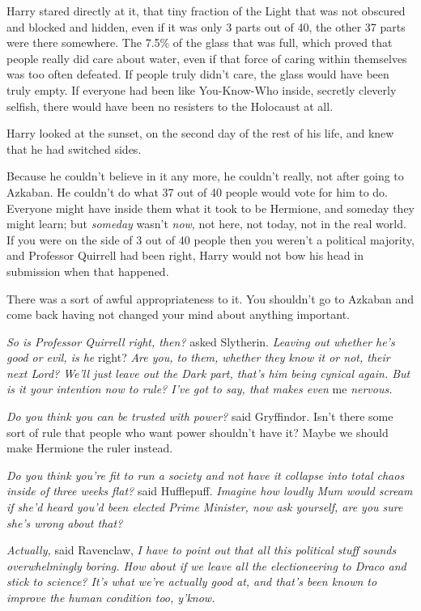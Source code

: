 Harry stared directly at it, that tiny fraction of the Light that was not obscured and blocked and hidden, even if it was only 3 parts out of 40, the other 37 parts were there somewhere. The 7.5\% of the glass that was full, which proved that people really did care about water, even if that force of caring within themselves was too often defeated. If people truly didn't care, the glass would have been truly empty. If everyone had been like You-Know-Who inside, secretly cleverly selfish, there would have been no resisters to the Holocaust at all.

Harry looked at the sunset, on the second day of the rest of his life, and knew that he had switched sides.

Because he couldn't believe in it any more, he couldn't really, not after going to Azkaban. He couldn't do what 37 out of 40 people would vote for him to do. Everyone might have inside them what it took to be Hermione, and someday they might learn; but \emph{someday} wasn't \emph{now}, not here, not today, not in the real world. If you were on the side of 3 out of 40 people then you weren't a political majority, and Professor Quirrell had been right, Harry would not bow his head in submission when that happened.

There was a sort of awful appropriateness to it. You shouldn't go to Azkaban and come back having not changed your mind about anything important.

\emph{So is Professor Quirrell right, then?} asked Slytherin. \emph{Leaving out whether he's good or evil, is he} right? \emph{Are you, to them, whether they know it or not, their next Lord? We'll just leave out the Dark part, that's him being cynical again. But is it your intention now to rule? I've got to say, that makes even} me \emph{nervous.}

\emph{Do you think you can be trusted with power?} said Gryffindor. Isn't there some sort of rule that people who want power shouldn't have it? Maybe we should make Hermione the ruler instead.

\emph{Do you think you're fit to run a society and not have it collapse into total chaos inside of three weeks flat?} said Hufflepuff. \emph{Imagine how loudly Mum would scream if she'd heard you'd been elected Prime Minister, now ask yourself, are you sure she's wrong about that?}

\emph{Actually,} said Ravenclaw, \emph{I have to point out that all this political stuff sounds overwhelmingly boring. How about if we leave all the electioneering to Draco and stick to science? It's what we're actually good at, and that's been known to improve the human condition too, y'know.}

